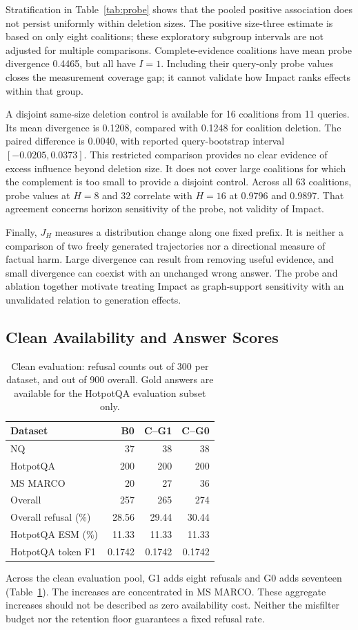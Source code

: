 \documentclass[sigconf]{aamas}
\begin{document}
Stratification in Table~\ref{tab:probe} shows that the pooled positive association does not persist uniformly within deletion sizes. The positive size-three estimate is based on only eight coalitions; these exploratory subgroup intervals are not adjusted for multiple comparisons. Complete-evidence coalitions have mean probe divergence 0.4465, but all have $I=1$. Including their query-only probe values closes the measurement coverage gap; it cannot validate how Impact ranks effects within that group.

A disjoint same-size deletion control is available for 16 coalitions from 11 queries. Its mean divergence is 0.1208, compared with 0.1248 for coalition deletion. The paired difference is 0.0040, with reported query-bootstrap interval $[-0.0205,0.0373]$. This restricted comparison provides no clear evidence of excess influence beyond deletion size. It does not cover large coalitions for which the complement is too small to provide a disjoint control. Across all 63 coalitions, probe values at $H=8$ and $32$ correlate with $H=16$ at 0.9796 and 0.9897. That agreement concerns horizon sensitivity of the probe, not validity of Impact.

Finally, $J_H$ measures a distribution change along one fixed prefix. It is neither a comparison of two freely generated trajectories nor a directional measure of factual harm. Large divergence can result from removing useful evidence, and small divergence can coexist with an unchanged wrong answer. The probe and ablation together motivate treating Impact as graph-support sensitivity with an unvalidated relation to generation effects.

\subsection{Clean Availability and Answer Scores}
\begin{table}[t]
\caption{Clean evaluation: refusal counts out of 300 per dataset, and out of 900 overall. Gold answers are available for the HotpotQA evaluation subset only.}
\label{tab:clean}
\centering
\begin{tabular}{lrrr}
\toprule
Dataset & B0 & C--G1 & C--G0\\
\midrule
NQ & 37 & 38 & 38\\
HotpotQA & 200 & 200 & 200\\
MS MARCO & 20 & 27 & 36\\
Overall & 257 & 265 & 274\\
Overall refusal (\%) & 28.56 & 29.44 & 30.44\\
HotpotQA ESM (\%) & 11.33 & 11.33 & 11.33\\
HotpotQA token F1 & 0.1742 & 0.1742 & 0.1742\\
\bottomrule
\end{tabular}
\end{table}
Across the clean evaluation pool, G1 adds eight refusals and G0 adds seventeen (Table~\ref{tab:clean}). The increases are concentrated in MS MARCO. These aggregate increases should not be described as zero availability cost. Neither the misfilter budget nor the retention floor guarantees a fixed refusal rate.
\end{document}
